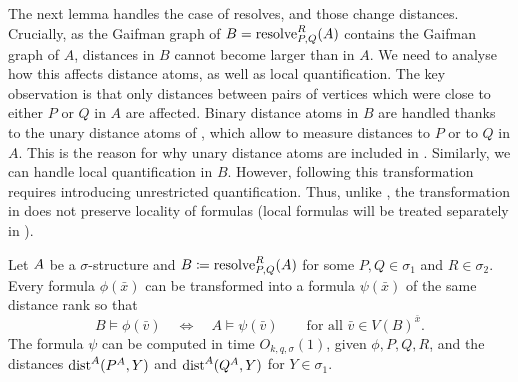The next lemma handles the case of
resolves, and those change distances. Crucially, as the Gaifman graph of $B=\mathrm{resolve}^{R}_{P,Q}({{A}})$ contains the Gaifman graph of $A$, distances in $B$
cannot become larger than in $A$.
We need to analyse how
this affects distance atoms, as well as
local quantification.
The key observation is that only distances
between pairs of vertices which were close to either $P$ or $Q$ in $A$ are affected.
Binary distance atoms in $B$ are handled thanks to the unary distance atoms of \distFO,
which allow to measure distances to $P$ or to $Q$ in $A$. This is the reason for why unary distance atoms are included in \distFO.
Similarly, we can handle local quantification in $B$. However, following this transformation
requires introducing unrestricted quantification.
Thus, unlike , the transformation in  does not preserve locality of formulas
(local formulas will be treated separately in ).

\begin{lemma}\label{lem:resolve-interp}
    Let ${{A}}$ be a $\sigma$-structure and \({{B}} \coloneqq \mathrm{resolve}^{R}_{P,Q}({{A}})\)
    for some $P,Q\in\sigma_1$ and $R\in\sigma_2$.
    Every \distFO formula \(\phi(\bar x)\) can be transformed into a \distFO formula \(\psi(\bar x)\) of the same distance rank
    so that
    \[B \models \phi(\bar v)\quad\iff\quad A \models \psi(\bar v)\qquad \text{for all }\bar v\in V(B)^{\bar x}.\]
    The formula $\psi$ can be computed in time $O_{k,q,\sigma}(1)$,
    given $\phi, P, Q,R$, and the distances  $\mathrm{dist}^A(P^A,Y)$ and $\mathrm{dist}^A(Q^A,Y)$ for $Y\in \sigma_1$.
\end{lemma}




